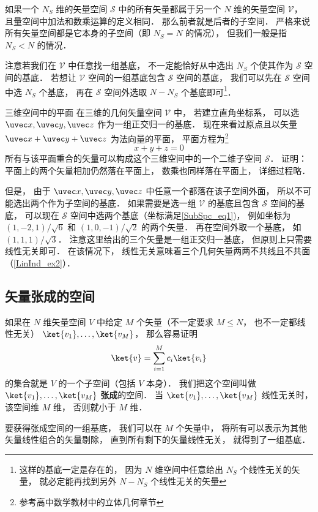 

如果一个 $N_S$ 维的矢量空间 $\mathcal S$ 中的所有矢量都属于另一个 $N$ 维的矢量空间 $\mathcal V$， 且量空间中加法和数乘运算的定义相同． 那么前者就是后者的子空间． 严格来说所有矢量空间都是它本身的子空间（即 $N_S = N$ 的情况）， 但我们一般是指 $N_S < N$ 的情况．

注意若我们在 $\mathcal V$ 中任意找一组基底， 不一定能恰好从中选出 $N_S$ 个使其作为 $\mathcal S$ 空间的基底． 若想让 $\mathcal V$ 空间的一组基底包含 $\mathcal S$ 空间的基底， 我们可以先在 $\mathcal S$ 空间中选 $N_S$ 个基底， 再在 $\mathcal S$ 空间外选取 $N - N_S$ 个基底即可\footnote{这样的基底一定是存在的， 因为 $N$ 维空间中任意给出 $N_S$ 个线性无关的矢量， 就必定能再找到另外 $N - N_S$ 个线性无关的矢量}．

\begin{example}{三维空间中的平面}
在三维的几何矢量空间 $\mathcal V$ 中， 若建立直角坐标系， 可以选 $\uvec x, \uvec y, \uvec z$ 作为一组正交归一的基底． 现在来看过原点且以矢量 $\uvec x + \uvec y + \uvec z$ 为法向量的平面， 平面方程为\footnote{参考高中数学教材中的立体几何章节}
\begin{equation}\label{SubSpc_eq1}
x + y + z = 0
\end{equation}
所有与该平面重合的矢量可以构成这个三维空间中的一个二维子空间 $\mathcal S$． 证明： 平面上的两个矢量相加仍然落在平面上， 数乘也同样落在平面上， 详细过程略． 

但是， 由于 $\uvec x, \uvec y, \uvec z$ 中任意一个都落在该子空间外面， 所以不可能选出两个作为子空间的基底． 如果需要是选一组 $\mathcal V$ 的基底且包含 $\mathcal S$ 空间的基底， 可以现在 $\mathcal S$ 空间中选两个基底（坐标满足\autoref{SubSpc_eq1})， 例如坐标为 $(1, -2, 1)/\sqrt{6}$ 和 $(1, 0, -1)/\sqrt{2}$ 的两个矢量． 再在空间外取一个基底， 如 $(1, 1, 1)/\sqrt{3}$． 注意这里给出的三个矢量是一组正交归一基底， 但原则上只需要线性无关即可． 在该情况下， 线性无关意味着三个几何矢量两两不共线且不共面（\autoref{LinInd_ex2}）．
\end{example}

\subsection{矢量张成的空间}
如果在 $N$ 维矢量空间 $V$ 中给定 $M$ 个矢量（不一定要求 $M \leqslant N$， 也不一定都线性无关） $\ket{v_1}, \dots, \ket{v_M}$， 那么容易证明
\begin{equation}
\ket{v} = \sum_{i=1}^M c_i \ket{v_i}
\end{equation}
的集合就是 $V$ 的一个子空间（包括 $V$ 本身）． 我们把这个空间叫做 $\ket{v_1}, \dots, \ket{v_M}$ \textbf{张成}的空间． 当 $\ket{v_1}, \dots, \ket{v_M}$ 线性无关时， 该空间维 $M$ 维， 否则就小于 $M$ 维．

要获得张成空间的一组基底， 我们可以在 $M$ 个矢量中， 将所有可以表示为其他矢量线性组合的矢量剔除， 直到所有剩下的矢量线性无关， 就得到了一组基底．
